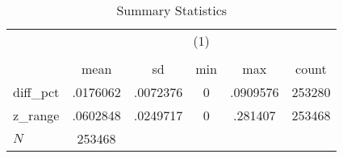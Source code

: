\begin{table}[htbp]\centering
\def\sym#1{\ifmmode^{#1}\else\(^{#1}\)\fi}
\caption{Summary Statistics}
\begin{tabular}{l*{1}{ccccc}}
\hline\hline
            &\multicolumn{5}{c}{(1)}                                         \\
            &\multicolumn{5}{c}{}                                            \\
            &        mean&          sd&         min&         max&       count\\
\hline
diff\_pct    &    .0176062&    .0072376&           0&    .0909576&      253280\\
z\_range     &    .0602848&    .0249717&           0&     .281407&      253468\\
\hline
\(N\)       &      253468&            &            &            &            \\
\hline\hline
\end{tabular}
\end{table}
